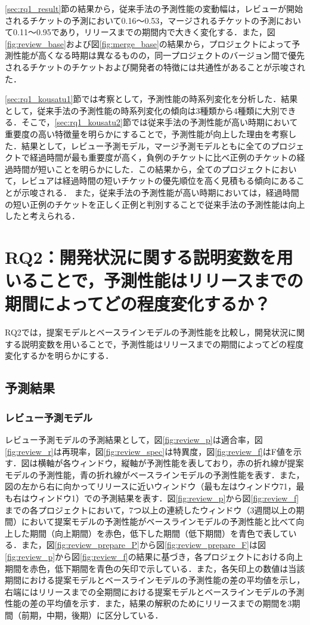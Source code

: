 \documentclass[11pt]{jreport}
\newcommand{\rqtwo}{開発状況に関する説明変数を用いることで，予測性能はリリースまでの期間によってどの程度変化するか？}
\begin{document}
\ref{sec:rq1_result}節の結果から，従来手法の予測性能の変動幅は，レビューが開始されるチケットの予測において0.16〜0.53，マージされるチケットの予測において0.11〜0.95であり，リリースまでの期間内で大きく変化する．また，図\ref{fig:review_base}および図\ref{fig:merge_base}の結果から，プロジェクトによって予測性能が高くなる時期は異なるものの，同一プロジェクトのバージョン間で優先されるチケットのチケットおよび開発者の特徴には共通性があることが示唆された．

\ref{sec:rq1_kousatu1}節では考察として，予測性能の時系列変化を分析した．結果として，従来手法の予測性能の時系列変化の傾向は3種類から4種類に大別できる．そこで，\ref{sec:rq1_kousatu2}節では従来手法の予測性能が高い時期において重要度の高い特徴量を明らかにすることで，予測性能が向上した理由を考察した．結果として，レビュー予測モデル，マージ予測モデルともに全てのプロジェクトで経過時間が最も重要度が高く，負例のチケットに比べ正例のチケットの経過時間が短いことを明らかにした．この結果から，全てのプロジェクトにおいて，レビュアは経過時間の短いチケットの優先順位を高く見積もる傾向にあることが示唆される．
また，従来手法の予測性能が高い時期においては，経過時間の短い正例のチケットを正しく正例と判別することで従来手法の予測性能は向上したと考えられる．


\chapter{RQ2：\rqtwo}\label{sec:rq2}
RQ2では，提案モデルとベースラインモデルの予測性能を比較し，開発状況に関する説明変数を用いることで，予測性能はリリースまでの期間によってどの程度変化するかを明らかにする．

\section{予測結果}\label{sec:rq2_result}
\subsection{レビュー予測モデル}\label{sec:rq2_review}
レビュー予測モデルの予測結果として，図\ref{fig:review_p}は適合率，図\ref{fig:review_r}は再現率，図\ref{fig:review_spec}は特異度，図\ref{fig:review_f}はF値を示す．図は横軸が各ウィンドウ，縦軸が予測性能を表しており，赤の折れ線が提案モデルの予測性能，青の折れ線がベースラインモデルの予測性能を表す．また，図の左から右に向かってリリースに近いウィンドウ（最も左はウィンドウ71，最も右はウィンドウ1）での予測結果を表す．図\ref{fig:review_p}から図\ref{fig:review_f}までの各プロジェクトにおいて，7つ以上の連続したウィンドウ（3週間以上の期間）において提案モデルの予測性能がベースラインモデルの予測性能と比べて向上した期間（向上期間）を赤色，低下した期間（低下期間）を青色で表している．また，図\ref{fig:review_prepare_P}から図\ref{fig:review_prepare_F}は図\ref{fig:review_p}から図\ref{fig:review_f}の結果に基づき，各プロジェクトにおける向上期間を赤色，低下期間を青色の矢印で示している．また，各矢印上の数値は当該期間における提案モデルとベースラインモデルの予測性能の差の平均値を示し，右端にはリリースまでの全期間における提案モデルとベースラインモデルの予測性能の差の平均値を示す．また，結果の解釈のためにリリースまでの期間を3期間（前期，中期，後期）に区分している．
\end{document}
